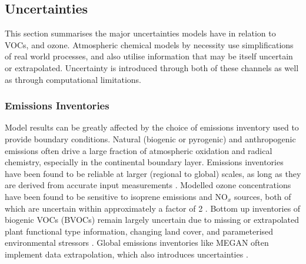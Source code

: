     
    
    
    
    
  \subsection{Uncertainties}
  \label{LR:Models:Uncert}
    
    This section summarises the major uncertainties models have in relation to  VOCs, and ozone.
    Atmospheric chemical models by necessity use simplifications of real world processes, and also utilise information that may be itself uncertain or extrapolated.
    Uncertainty is introduced through both of these channels as well as through computational limitations.
    
    
    
    \subsubsection{Emissions Inventories}
      Model results can be greatly affected by the choice of emissions inventory used to provide boundary conditions.
      Natural (biogenic or pyrogenic) and anthropogenic emissions often drive a large fraction of atmospheric oxidation and radical chemistry, especially in the continental boundary layer.
      Emissions inventories have been found to be reliable at larger (regional to global) scales, as long as they are derived from accurate input measurements \parencite{Zeng2015}.
      Modelled ozone concentrations have been found to be sensitive to isoprene 
      emissions and NO$_x$ sources, both of which are uncertain within 
      approximately a factor of 2 \parencite{Christian2017}.
      Bottom up inventories of biogenic VOCs (BVOCs) remain largely uncertain due to missing or extrapolated plant functional type information, changing land cover, and parameterised environmental stressors \parencite{Guenther2000, Kanakidou2005, Millet2006}.
      Global emissions inventories like MEGAN often implement data extrapolation, which also introduces uncertainties \parencite{Miller2014}.
      
